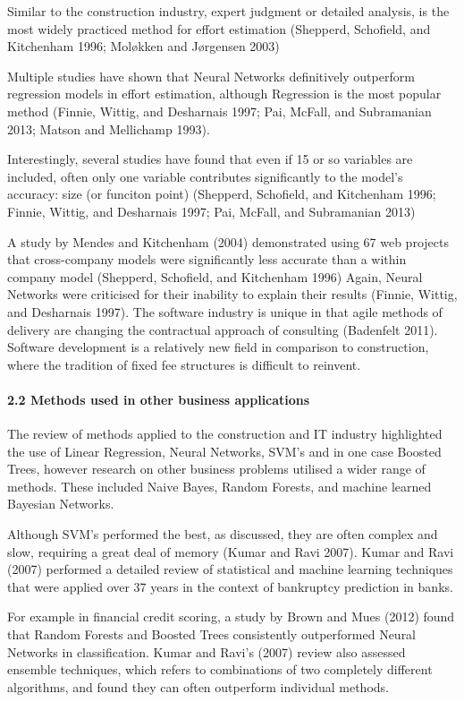 \documentclass[]{elsarticle} %
\begin{document}
Similar to the construction industry, expert judgment or detailed
analysis, is the most widely practiced method for effort estimation
(Shepperd, Schofield, and Kitchenham 1996; Moløkken and Jørgensen 2003)

Multiple studies have shown that Neural Networks definitively outperform
regression models in effort estimation, although Regression is the most
popular method (Finnie, Wittig, and Desharnais 1997; Pai, McFall, and
Subramanian 2013; Matson and Mellichamp 1993).

Interestingly, several studies have found that even if 15 or so
variables are included, often only one variable contributes
significantly to the model's accuracy: size (or funciton point)
(Shepperd, Schofield, and Kitchenham 1996; Finnie, Wittig, and
Desharnais 1997; Pai, McFall, and Subramanian 2013)

A study by Mendes and Kitchenham (2004) demonstrated using 67 web
projects that cross-company models were significantly less accurate than
a within company model (Shepperd, Schofield, and Kitchenham 1996) Again,
Neural Networks were criticised for their inability to explain their
results (Finnie, Wittig, and Desharnais 1997). The software industry is
unique in that agile methods of delivery are changing the contractual
approach of consulting (Badenfelt 2011). Software development is a
relatively new field in comparison to construction, where the tradition
of fixed fee structures is difficult to reinvent.

\paragraph{2.2 Methods used in other business
applications}\label{methods-used-in-other-business-applications}

The review of methods applied to the construction and IT industry
highlighted the use of Linear Regression, Neural Networks, SVM's and in
one case Boosted Trees, however research on other business problems
utilised a wider range of methods. These included Naive Bayes, Random
Forests, and machine learned Bayesian Networks.

Although SVM's performed the best, as discussed, they are often complex
and slow, requiring a great deal of memory (Kumar and Ravi 2007). Kumar
and Ravi (2007) performed a detailed review of statistical and machine
learning techniques that were applied over 37 years in the context of
bankruptcy prediction in banks.

For example in financial credit scoring, a study by Brown and Mues
(2012) found that Random Forests and Boosted Trees consistently
outperformed Neural Networks in classification. Kumar and Ravi's (2007)
review also assessed ensemble techniques, which refers to combinations
of two completely different algorithms, and found they can often
outperform individual methods.
\end{document}
